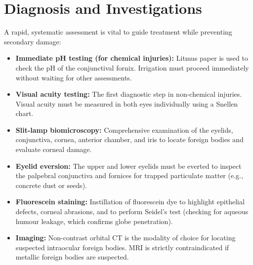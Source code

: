 \section*{Diagnosis and Investigations}
A rapid, systematic assessment is vital to guide treatment while preventing secondary damage:
\begin{itemize}
    \item \textbf{Immediate pH testing (for chemical injuries):} Litmus paper is used to check the pH of the conjunctival fornix. Irrigation must proceed immediately without waiting for other assessments.
    \item \textbf{Visual acuity testing:} The first diagnostic step in non-chemical injuries. Visual acuity must be measured in both eyes individually using a Snellen chart.
    \item \textbf{Slit-lamp biomicroscopy:} Comprehensive examination of the eyelids, conjunctiva, cornea, anterior chamber, and iris to locate foreign bodies and evaluate corneal damage.
    \item \textbf{Eyelid eversion:} The upper and lower eyelids must be everted to inspect the palpebral conjunctiva and fornices for trapped particulate matter (e.g., concrete dust or seeds).
    \item \textbf{Fluorescein staining:} Instillation of fluorescein dye to highlight epithelial defects, corneal abrasions, and to perform Seidel's test (checking for aqueous humour leakage, which confirms globe penetration).
    \item \textbf{Imaging:} Non-contrast orbital CT is the modality of choice for locating suspected intraocular foreign bodies. MRI is strictly contraindicated if metallic foreign bodies are suspected.
\end{itemize}

